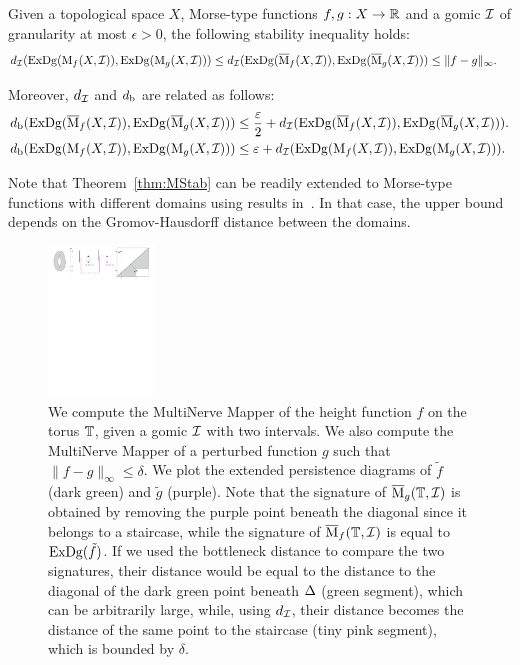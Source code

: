 \begin{thm}\label{thm:MStab}
Given a topological space $X$, Morse-type functions $f,g:X\to\mathbb{R}$ and a gomic $\mathcal{I}$ of granularity at most $\epsilon > 0$, 
the following stability inequality holds:
%
\begin{align}
&d_{\mathcal{I}}(\mathrm{ExDg}(\mathrm{M}_f(X,\mathcal{I})),\mathrm{ExDg}(\mathrm{M}_g(X,\mathcal{I}))) \leq d_{\mathcal{I}}(\mathrm{ExDg}(\overline{\mathrm{M}}_f(X,\mathcal{I})),\mathrm{ExDg}(\overline{\mathrm{M}}_g(X,\mathcal{I}))) \leq \|f-g\|_\infty. \label{ineq:stabilitydi}
\end{align}

Moreover, $d_{\mathcal{I}}$ and $d_{\rm b}$ are related as follows:
%
\begin{align}
&d_{\rm b}(\mathrm{ExDg}(\overline{\mathrm{M}}_f(X,\mathcal{I})),\mathrm{ExDg}(\overline{\mathrm{M}}_g(X,\mathcal{I}))) \leq \frac {\varepsilon}2 + d_{\mathcal{I}}(\mathrm{ExDg}(\overline{\mathrm{M}}_f(X,\mathcal{I})),\mathrm{ExDg}(\overline{\mathrm{M}}_g(X,\mathcal{I}))).\label{ineq:didbMM}\\
&d_{\rm b}(\mathrm{ExDg}(\mathrm{M}_f(X,\mathcal{I})),\mathrm{ExDg}(\mathrm{M}_g(X,\mathcal{I}))) \leq \varepsilon + d_{\mathcal{I}}(\mathrm{ExDg}(\mathrm{M}_f(X,\mathcal{I})),\mathrm{ExDg}(\mathrm{M}_g(X,\mathcal{I}))).\label{ineq:didbM}
\end{align}
%
\end{thm}
%
Note that Theorem~\ref{thm:MStab} can be readily extended to Morse-type functions with different domains using results in~\cite{Carriere15b}.
In that case, the upper bound depends on the Gromov-Hausdorff distance between the domains. 
%
\begin{figure}[t]\begin{center}
\includegraphics[height=4cm]{figures/InstabBottleneck}
\caption[Stability of the Mapper]{\label{fig:counterexample} We compute the MultiNerve Mapper of the height function $f$ on the torus $\mathbb{T}$,
given a gomic $\mathcal{I}$ with two intervals.
We also compute the MultiNerve Mapper of a perturbed function $g$ such that $\|f-g\|_\infty\leq\delta$.
We plot the extended persistence diagrams of $\tilde f$ (dark green) and $\tilde g$ (purple). Note that the signature of $\overline{\mathrm{M}}_g(\mathbb{T},\mathcal{I})$
is obtained by removing the purple point beneath the diagonal since it belongs to a staircase, while the signature of $\overline{\mathrm{M}}_f(\mathbb{T},\mathcal{I})$
is equal to $\mathrm{ExDg}({\tilde f})$. If we used the bottleneck distance to compare the two signatures, their distance would be equal to
the distance to the diagonal of the dark green point beneath $\Delta$ (green segment), which can be arbitrarily large, while, using 
$d_{\mathcal{I}}$, their distance becomes the distance of the
same point to the staircase (tiny pink segment), which is bounded by $\delta$.}
\end{center}\end{figure}
%

